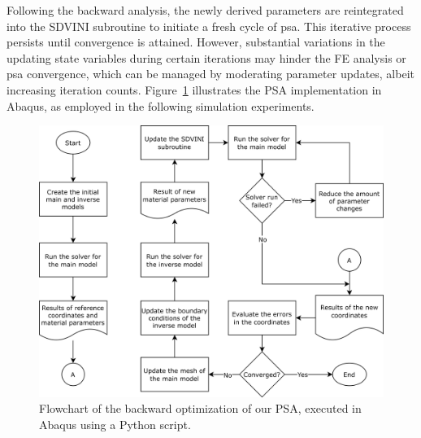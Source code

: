 Following the backward analysis, the newly derived parameters are reintegrated into the SDVINI subroutine to initiate a fresh cycle of \ac{psa}. This iterative process persists until convergence is attained. However, substantial variations in the updating state variables during certain iterations may hinder the FE analysis or \ac{psa} convergence, which can be managed by moderating parameter updates, albeit increasing iteration counts. Figure~\ref{fig:psa_run} illustrates the PSA implementation in Abaqus, as employed in the following simulation experiments.

\begin{figure}[t]\centering
\includegraphics[width=\textwidth]{img/psa_run.png}
\caption{Flowchart of the backward optimization of our PSA, executed in Abaqus using a Python script.}
\label{fig:psa_run}
\end{figure}

